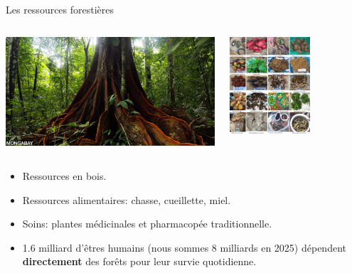 \documentclass[10pt,table,dvipsnames,compress]{beamer}
\begin{document}
\begin{frame}[label={sec:orgb7ab646}]{Les ressources forestières}
\begin{columns}
\begin{column}{0.5\columnwidth}
\begin{center}
\includegraphics[width=\textwidth]{figs/costa_rica_osa_0077_1280x670.jpg}
\end{center}
\end{column}
\begin{column}{0.5\columnwidth}
\begin{center}
\includegraphics[width=0.6\textwidth]{figs/cueillette.jpg}
\end{center}
\end{column}
\end{columns}
\begin{itemize}
\item Ressources en bois.
\item Ressources alimentaires: chasse, cueillette, miel.
\item Soins: plantes médicinales et pharmacopée traditionnelle.
\item 1.6 milliard d'êtres humains (nous sommes 8 milliards en 2025) dépendent \textbf{directement} des forêts pour leur survie quotidienne.
\end{itemize}
\end{frame}
\end{document}
